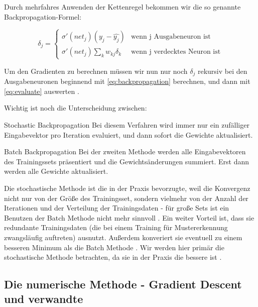 Durch mehrfahres Anwenden der Kettenregel bekommen wir die so genannte Backpropagation-Formel:

\begin{equation}
\label{eq:backpropagation}
\delta_j =  \begin{cases}
               \sigma ' (net_j) (y_j - \hat{y_j})           & \text{wenn j Ausgabeneuron ist}\\
               \sigma ' (net_j) \sum_k w_{kj} \delta_k     & \text{wenn j verdecktes Neuron ist}
           \end{cases} 
\end{equation} 


Um den Gradienten zu berechnen müssen wir nun nur noch $\delta_j$ rekursiv bei den Ausgabeneuronen beginnend mit \ref{eq:backpropagation} berechnen, und dann mit \ref{eq:evaluate} auswerten \cite{bishop1995neural}. 

Wichtig ist noch die Unterscheidung zwischen:

\begin{LaTeXdescription}
	\item[Stochastic Backpropagation]
	Bei diesem Verfahren wird immer nur ein zufälliger Eingabevektor pro Iteration evaluiert, und dann sofort die Gewichte aktualisiert. 
	\item[Batch Backpropagation] 
	Bei der zweiten Methode werden alle Eingabevektoren des Trainingssets präsentiert und die Gewichtsänderungen summiert. Erst dann werden alle Gewichte aktualisiert.\cite{duda2012pattern}
\end{LaTeXdescription}

Die stochastische Methode ist die in der Praxis bevorzugte, weil die Konvergenz nicht nur von der Größe des Trainingsset, sondern vielmehr von der Anzahl der Iterationen und der Verteilung der Trainingsdaten - für große Sets ist ein Benutzen der Batch Methode nicht mehr sinnvoll \cite{bengio2012practical}.
Ein weiter Vorteil ist, dass sie redundante Trainingsdaten (die bei einem Training für Mustererkennung zwangsläufig auftreten) ausnutzt. Außerdem konveriert sie eventuell zu einem besseren Minimum als die Batch Methode \cite{lecunefficient}.
Wir werden hier primär die stochastische Methode betrachten, da sie in der Praxis die bessere ist \cite{lecunefficient, bengio2012practical}.


\subsection{Die numerische Methode - Gradient Descent und verwandte}

